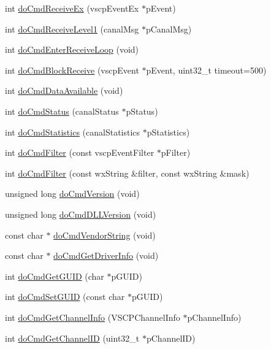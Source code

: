 \begin{DoxyCompactItemize}
int \hyperlink{class_vscp_tcp_if_a499cabb10e89f5af7aeee6109c29d1f9}{doCmdReceiveEx} (vscpEventEx $\ast$pEvent)
\item 
int \hyperlink{class_vscp_tcp_if_ac5ee2a0717b9184f7b41786ec9300642}{doCmdReceiveLevel1} (canalMsg $\ast$pCanalMsg)
\item 
int \hyperlink{class_vscp_tcp_if_afbbbb192d91089a5d881150a4760e760}{doCmdEnterReceiveLoop} (void)
\item 
int \hyperlink{class_vscp_tcp_if_a491f6e8c03cda286e9d7adac50d1996f}{doCmdBlockReceive} (vscpEvent $\ast$pEvent, uint32\_\-t timeout=500)
\item 
int \hyperlink{class_vscp_tcp_if_ae68f837b448c3b2b2d906a476952033e}{doCmdDataAvailable} (void)
\item 
int \hyperlink{class_vscp_tcp_if_afc54763410f122eb1a57f593325449aa}{doCmdStatus} (canalStatus $\ast$pStatus)
\item 
int \hyperlink{class_vscp_tcp_if_ac1106b4d474d0185387e3f37d71362ad}{doCmdStatistics} (canalStatistics $\ast$pStatistics)
\item 
int \hyperlink{class_vscp_tcp_if_a592aa4460e7c8881c610e7b09dfa6bff}{doCmdFilter} (const vscpEventFilter $\ast$pFilter)
\item 
int \hyperlink{class_vscp_tcp_if_afbab956ec34be67de396ccf805935915}{doCmdFilter} (const wxString \&filter, const wxString \&mask)
\item 
unsigned long \hyperlink{class_vscp_tcp_if_a23f350d95cd15e82cd60cdddb90c3361}{doCmdVersion} (void)
\item 
unsigned long \hyperlink{class_vscp_tcp_if_ab2f4f9d4d403ee847442826234caf9d6}{doCmdDLLVersion} (void)
\item 
const char $\ast$ \hyperlink{class_vscp_tcp_if_a1d4f5113557b340ab21680376e76205e}{doCmdVendorString} (void)
\item 
const char $\ast$ \hyperlink{class_vscp_tcp_if_a74cef360f4a9e071260cd28f6dc92c69}{doCmdGetDriverInfo} (void)
\item 
int \hyperlink{class_vscp_tcp_if_a50eda6433504f7461baa68b93b472229}{doCmdGetGUID} (char $\ast$pGUID)
\item 
int \hyperlink{class_vscp_tcp_if_a30b187446749a1e2a94015a81726d9ee}{doCmdSetGUID} (const char $\ast$pGUID)
\item 
int \hyperlink{class_vscp_tcp_if_a4d7a5c92acc34c793366ae5572cbd6f6}{doCmdGetChannelInfo} (VSCPChannelInfo $\ast$pChannelInfo)
\item 
int \hyperlink{class_vscp_tcp_if_a3b299fe4a8c54e6e124dbf9ccb511b97}{doCmdGetChannelID} (uint32\_\-t $\ast$pChannelID)

\end{DoxyCompactItemize}
